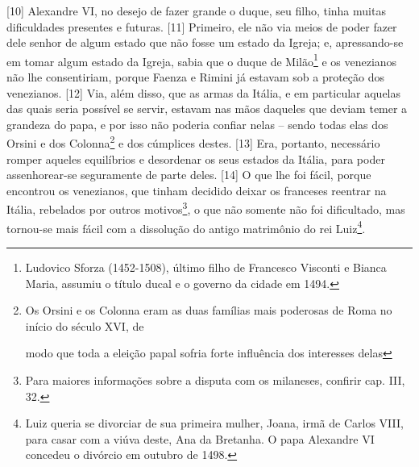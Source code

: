 {[}10{]} Alexandre VI, no desejo de fazer grande o duque, seu filho,
tinha muitas dificuldades presentes e futuras. {[}11{]} Primeiro, ele
não via meios de poder fazer dele senhor de algum estado que não fosse
um estado da Igreja; e, apressando-se em tomar algum estado da Igreja,
sabia que o duque de Milão\footnote{Ludovico Sforza (1452-1508), último
  filho de Francesco Visconti e Bianca Maria, assumiu o título ducal e o
  governo da cidade em 1494.} e os venezianos não lhe consentiriam,
porque Faenza e Rimini já estavam sob a proteção dos venezianos.
{[}12{]} Via, além disso, que as armas da Itália, e em particular
aquelas das quais seria possível se servir, estavam nas mãos daqueles
que deviam temer a grandeza do papa, e por isso não poderia confiar
nelas -- sendo todas elas dos Orsini e dos Colonna\footnote{Os Orsini e
  os Colonna eram as duas famílias mais poderosas de Roma no início do
  século XVI, de

  modo que toda a eleição papal sofria forte influência dos interesses
  delas} e dos cúmplices destes. {[}13{]} Era, portanto, necessário
romper aqueles equilíbrios e desordenar os seus estados da Itália, para
poder assenhorear-se seguramente de parte deles. {[}14{]} O que lhe foi
fácil, porque encontrou os venezianos, que tinham decidido deixar os
franceses reentrar na Itália, rebelados por outros motivos\footnote{Para
  maiores informações sobre a disputa com os milaneses, confirir cap.
  III, 32.}, o que não somente não foi dificultado, mas tornou-se mais
fácil com a dissolução do antigo matrimônio do rei Luiz\footnote{Luiz
  queria se divorciar de sua primeira mulher, Joana, irmã de Carlos
  VIII, para casar com a viúva deste, Ana da Bretanha. O papa Alexandre
  VI concedeu o divórcio em outubro de 1498.}.


